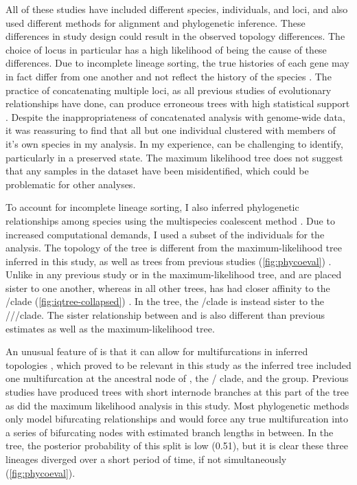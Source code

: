 All of these studies have included different species, individuals, and loci, and 
also used different methods for alignment and phylogenetic inference. 
These differences in study design could result in the observed topology differences. 
The choice of locus in particular has a high likelihood of being the cause of these differences. 
Due to incomplete lineage sorting, the true histories of each gene may in fact 
differ from one another and not reflect the history of the species \parencite{kingman1982}. 
The practice of concatenating multiple loci, as all previous studies of
\anaxyrus evolutionary relationships have done, can produce erroneous trees  
with high statistical support \parencite{kubatko2007}.
Despite the inappropriateness of concatenated analysis with genome-wide data,
it was reassuring to find that all but one individual clustered with members
of it's own species in my analysis. 
In my experience, \anaxyrus can be challenging to identify, particularly in a preserved state. 
The maximum likelihood tree does not suggest that any samples in the dataset 
have been misidentified, which could be problematic for other analyses.

To account for incomplete lineage sorting, I also inferred phylogenetic     
relationships among \anaxyrus species using the multispecies coalescent 
method \phycoeval. 
Due to increased computational demands, I used a subset of the individuals for 
the \phycoeval analysis.
The topology of the \phycoeval tree is different from the  
maximum-likelihood tree inferred in this study, as well as trees from previous 
studies (\cref{fig:phycoeval}) \parencite{fontenot2011,graybeal1997,masta2002,pramuk2007,pyron2011,portik2023}. 
Unlike in any previous study or in the maximum-likelihood tree, \amer and \terr are 
placed sister to one another, whereas in all other trees, \amer has had closer 
affinity to the \hemiophrys/\baxteri clade (\cref{fig:iqtree-collapsed}) \parencite{pyron2011,portik2023}.
In the \phycoeval tree, the \hemiophrys/\baxteri clade is instead sister
to the \amer/\fowl/\terr/\wood clade.
The sister relationship between \fowl and \wood is also different 
than previous estimates as well as the maximum-likelihood tree.

An unusual feature of \phycoeval is that it can allow for multifurcations in  
inferred topologies \parencite{oaks2022}, which proved to be relevant in this 
study as the inferred tree included
one multifurcation at the ancestral node of \quercicus, the \cognatus/\speciosus
clade, and the \americanus group. 
Previous studies have produced trees with short internode branches at this
part of the tree as did the maximum likelihood analysis in this study. 
Most phylogenetic methods only model bifurcating relationships and would force 
any true multifurcation into a series of bifurcating nodes with estimated branch lengths in between.
In the \phycoeval tree, the posterior probability of this split is low (0.51), 
but it is clear these three lineages diverged over a short period of time, if 
not simultaneously (\cref{fig:phycoeval}).

